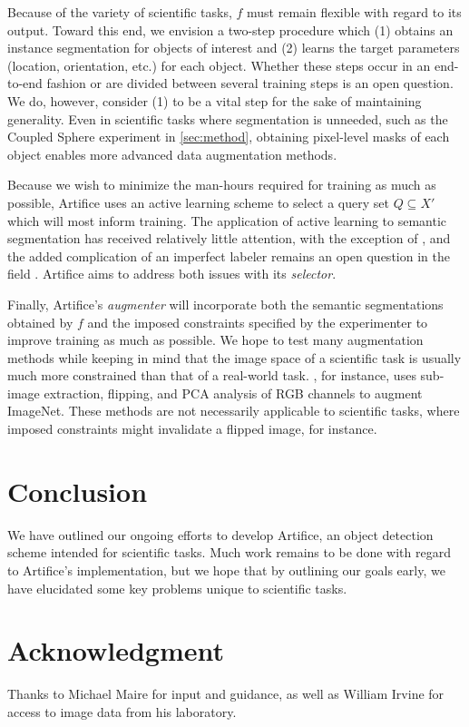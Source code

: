 \documentclass[10pt, journal]{IEEEtran}
\begin{document}
Because of the variety of scientific tasks, $f$ must remain flexible with regard
to its output. Toward this end, we envision a two-step procedure which (1)
obtains an instance segmentation \cite{ronneberger_u-net:_2015, bai_deep_2016}
for objects of interest and (2) learns the target parameters (location,
orientation, etc.) for each object. Whether these steps occur in an end-to-end
fashion or are divided between several training steps is an open question. We
do, however, consider (1) to be a vital step for the sake of maintaining
generality. Even in scientific tasks where segmentation is unneeded, such as the
Coupled Sphere experiment in \ref{sec:method}, obtaining pixel-level masks of
each object enables more advanced data augmentation methods.

Because we wish to minimize the man-hours required for training as much as
possible, Artifice uses an active learning scheme to select a query set
$Q \subseteq X'$ which will most inform training. The application of active
learning to semantic segmentation has received relatively little attention, with
the exception of \cite{vezhnevets_active_2012}, and the added complication of an
imperfect labeler remains an open question in the field
\cite{settles_active_2012}. Artifice aims to address both issues with its
\emph{selector}.

Finally, Artifice's \emph{augmenter} will incorporate both the semantic
segmentations obtained by $f$ and the imposed constraints specified by the
experimenter to improve training as much as possible. We hope to test many
augmentation methods while keeping in mind that the image space of a scientific
task is usually much more constrained than that of a real-world
task. \cite{krizhevsky_imagenet_2012}, for instance, uses sub-image extraction,
flipping, and PCA analysis of RGB channels to augment ImageNet. These methods are
not necessarily applicable to scientific tasks, where imposed constraints might
invalidate a flipped image, for instance.

\section{Conclusion}
\label{sec:conclusion}

We have outlined our ongoing efforts to develop Artifice, an object detection
scheme intended for scientific tasks. Much work remains to be done with regard
to Artifice's implementation, but we hope that by outlining our goals early, we
have elucidated some key problems unique to scientific tasks.

\section*{Acknowledgment}
\label{sec:acknowledgment}

Thanks to Michael Maire for input and guidance, as well as William Irvine for
access to image data from his laboratory.



\end{document}
